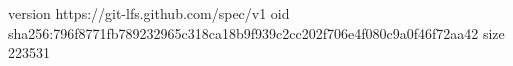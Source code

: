 version https://git-lfs.github.com/spec/v1
oid sha256:796f8771fb789232965c318ca18b9f939c2cc202f706e4f080c9a0f46f72aa42
size 223531
